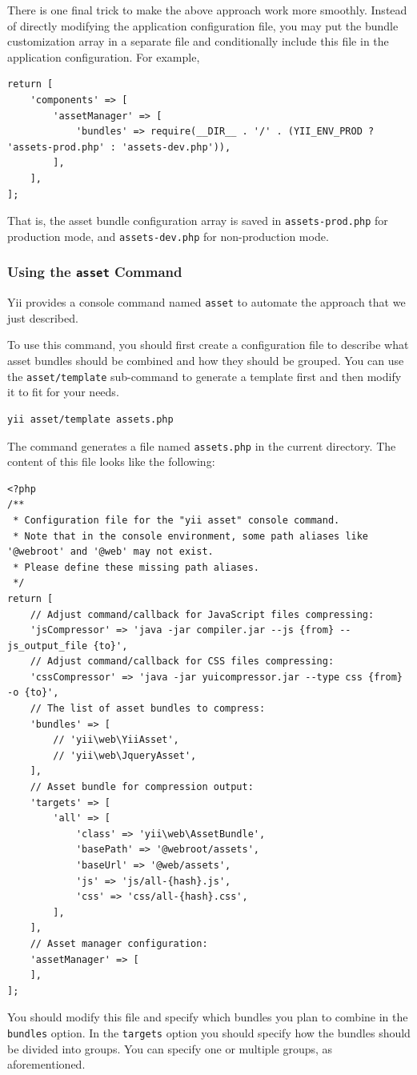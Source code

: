 There is one final trick to make the above approach work more smoothly. Instead of directly modifying the
application configuration file, you may put the bundle customization array in a separate file and conditionally
include this file in the application configuration. For example,

\lstset{language=php}\begin{lstlisting}
return [
    'components' => [
        'assetManager' => [
            'bundles' => require(__DIR__ . '/' . (YII_ENV_PROD ? 'assets-prod.php' : 'assets-dev.php')),  
        ],
    ],
];
\end{lstlisting}
That is, the asset bundle configuration array is saved in \lstinline|assets-prod.php| for production mode, and
\lstinline|assets-dev.php| for non-production mode.

\subsubsection{Using the \lstinline|asset| Command \label{structure-assets.md::using-asset-command}}
Yii provides a console command named \lstinline|asset| to automate the approach that we just described.

To use this command, you should first create a configuration file to describe what asset bundles should
be combined and how they should be grouped. You can use the \lstinline|asset/template| sub-command to generate
a template first and then modify it to fit for your needs.

\begin{lstlisting}
yii asset/template assets.php
\end{lstlisting}
The command generates a file named \lstinline|assets.php| in the current directory. The content of this file looks like the following:

\lstset{language=php}\begin{lstlisting}
<?php
/**
 * Configuration file for the "yii asset" console command.
 * Note that in the console environment, some path aliases like '@webroot' and '@web' may not exist.
 * Please define these missing path aliases.
 */
return [
    // Adjust command/callback for JavaScript files compressing:
    'jsCompressor' => 'java -jar compiler.jar --js {from} --js_output_file {to}',
    // Adjust command/callback for CSS files compressing:
    'cssCompressor' => 'java -jar yuicompressor.jar --type css {from} -o {to}',
    // The list of asset bundles to compress:
    'bundles' => [
        // 'yii\web\YiiAsset',
        // 'yii\web\JqueryAsset',
    ],
    // Asset bundle for compression output:
    'targets' => [
        'all' => [
            'class' => 'yii\web\AssetBundle',
            'basePath' => '@webroot/assets',
            'baseUrl' => '@web/assets',
            'js' => 'js/all-{hash}.js',
            'css' => 'css/all-{hash}.css',
        ],
    ],
    // Asset manager configuration:
    'assetManager' => [
    ],
];
\end{lstlisting}
You should modify this file and specify which bundles you plan to combine in the \lstinline|bundles| option. In the \lstinline|targets| 
option you should specify how the bundles should be divided into groups. You can specify one or multiple groups, 
as aforementioned.

